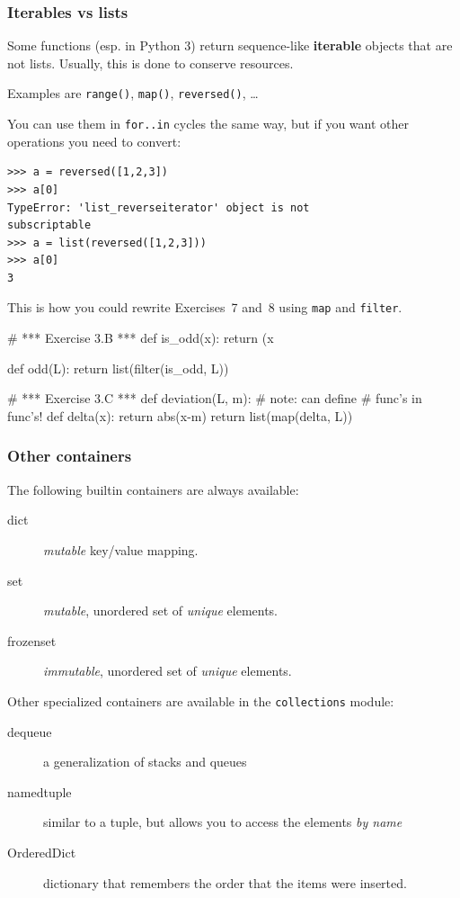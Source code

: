 \documentclass[english,serif,mathserif,xcolor=pdftex,dvipsnames,table]{beamer}
\begin{document}
\begin{frame}[fragile]
  \frametitle{Iterables vs lists}

  Some functions (esp. in Python 3) return sequence-like
  \textbf{iterable} objects that are not lists.
  Usually, this is done to conserve resources.

  \+
  Examples are \texttt{range()}, \texttt{map()}, \texttt{reversed()}, \ldots

  \+
  You can use them in \texttt{for..in} cycles the same way,
    but if you want other operations you need to convert:

\begin{lstlisting}
>>> a = reversed([1,2,3])
>>> a[0]
TypeError: 'list_reverseiterator' object is not
subscriptable
>>> a = list(reversed([1,2,3]))
>>> a[0]
3
\end{lstlisting}
\end{frame}


\begin{frame}[fragile]
  This is how you could rewrite Exercises~7 and~8 using \texttt{map} and
  \texttt{filter}.

\begin{python}
# *** Exercise 3.B ***
def is_odd(x):
  return (x %

def odd(L):
  return list(filter(is_odd, L))
\end{python}
\begin{python}
# *** Exercise 3.C ***
def deviation(L, m):
  # note: can define
  # func's in func's!
  def delta(x):
    return abs(x-m)
  return list(map(delta, L))
\end{python}
\end{frame}



\begin{frame}
  \frametitle{Other containers}

  The following builtin containers are always available:
  \begin{description}
  \item[dict] \textit{mutable} key/value mapping.
  \item[set] \textit{mutable}, unordered set of \textit{unique} elements.
  \item[frozenset] \textit{immutable}, unordered set of
    \textit{unique} elements.
  \end{description}

  \pause
  Other specialized containers are available in the
  \texttt{collections} module:

  \begin{description}
  \item[dequeue] a generalization of stacks and queues
  \item[namedtuple] similar to a tuple, but allows you to access the
    elements \textit{by name}
  \item[OrderedDict] dictionary that remembers the order that the
    items were inserted.
  \end{description}
\end{frame}
\end{document}
